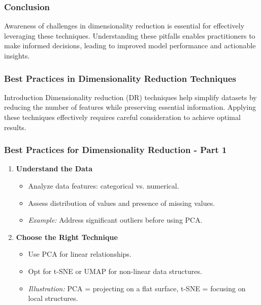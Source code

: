 \documentclass[aspectratio=169]{beamer}
\begin{document}
\begin{frame}[fragile]
    \frametitle{Conclusion}
    Awareness of challenges in dimensionality reduction is essential for effectively leveraging these techniques. Understanding these pitfalls enables practitioners to make informed decisions, leading to improved model performance and actionable insights.
\end{frame}

\begin{frame}[fragile]
    \frametitle{Best Practices in Dimensionality Reduction Techniques}
    \begin{block}{Introduction}
        Dimensionality reduction (DR) techniques help simplify datasets by reducing the number of features while preserving essential information. 
        Applying these techniques effectively requires careful consideration to achieve optimal results.
    \end{block}
\end{frame}

\begin{frame}[fragile]
    \frametitle{Best Practices for Dimensionality Reduction - Part 1}
    \begin{enumerate}
        \item \textbf{Understand the Data}
        \begin{itemize}
            \item Analyze data features: categorical vs. numerical.
            \item Assess distribution of values and presence of missing values.
            \item \textit{Example:} Address significant outliers before using PCA.
        \end{itemize}

        \item \textbf{Choose the Right Technique}
        \begin{itemize}
            \item Use PCA for linear relationships.
            \item Opt for t-SNE or UMAP for non-linear data structures.
            \item \textit{Illustration:} PCA = projecting on a flat surface, t-SNE = focusing on local structures.
        \end{itemize}
    \end{enumerate}
\end{frame}
\end{document}
